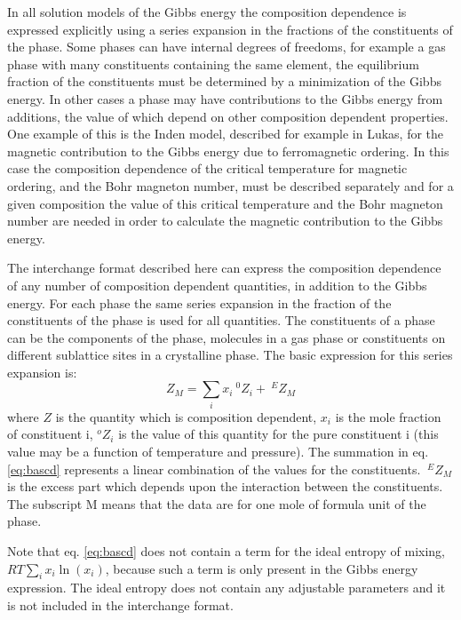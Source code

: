 \documentclass[12pt]{article}
\begin{document}
In all solution models of the Gibbs energy the composition dependence
is expressed explicitly using a series expansion in the fractions of
the constituents of the phase.  Some phases can have internal degrees
of freedoms, for example a gas phase with many constituents containing
the same element, the equilibrium fraction of the constituents must be
determined by a minimization of the Gibbs energy.  In other cases a
phase may have contributions to the Gibbs energy from additions, the
value of which depend on other composition dependent properties.  One
example of this is the Inden model, described for example in
Lukas\cite{07Luk}, for the magnetic contribution to the Gibbs energy
due to ferromagnetic ordering.  In this case the composition
dependence of the critical temperature for magnetic ordering, and the
Bohr magneton number, must be described separately and for a given
composition the value of this critical temperature and the Bohr
magneton number are needed in order to calculate the magnetic
contribution to the Gibbs energy.

The interchange format described here can express the composition
dependence of any number of composition dependent quantities, in
addition to the Gibbs energy.  For each phase the same series
expansion in the fraction of the constituents of the phase is used for
all quantities.  The constituents of a phase can be the components of
the phase, molecules in a gas phase or constituents on different
sublattice sites in a crystalline phase.  The basic expression for
this series expansion is:
\begin{equation}
Z_M = \sum_i x_i ~^0Z_i + ~^EZ_M \label{eq:bascd}
\end{equation}
where $Z$ is the quantity which is composition dependent, $x_i$ is the
mole fraction of constituent i, $^oZ_i$ is the value of this quantity
for the pure constituent i (this value may be a function of
temperature and pressure).  The summation in eq.  \ref{eq:bascd}
represents a linear combination of the values for the constituents.
$~^EZ_M$ is the excess part which depends upon the interaction between
the constituents.  The subscript M means that the data are for one
mole of formula unit of the phase.

Note that eq.  \ref{eq:bascd} does not contain a term for the ideal
entropy of mixing, $RT\sum_i x_i\ln(x_i)$, because such a term is only
present in the Gibbs energy expression.  The ideal entropy does not
contain any adjustable parameters and it is not included in the
interchange format.
\end{document}
